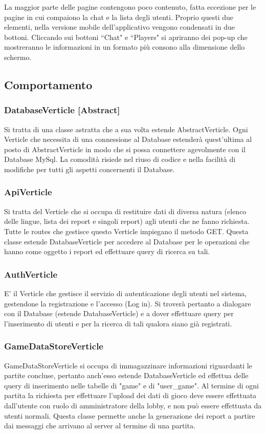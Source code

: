 \noindent La maggior parte delle pagine contengono poco contenuto, fatta eccezione per le pagine in cui compaiono la chat e la lista degli utenti.\newline
Proprio questi due elementi, nella versione mobile dell'applicativo vengono condensati in due bottoni. Cliccando sui bottoni ``Chat" e ``Players" si apriranno dei pop-up che mostreranno le informazioni in un formato più consono alla dimensione dello schermo.

\subsection{Comportamento}
%
\subsubsection{DatabaseVerticle [Abstract]}
Si tratta di una classe astratta che a sua volta estende AbstractVerticle. Ogni Verticle che necessita di una connessione al Database estenderà quest'ultima al posto di AbstractVerticle in modo che si possa connettere agevolmente con il Database MySql. La comodità risiede nel riuso di codice e nella facilità di modifiche per tutti gli aspetti concernenti il Database.

\subsubsection{ApiVerticle}
Si tratta del Verticle che si occupa di restituire dati di diversa natura (elenco delle lingue, lista dei report e singoli report) agli utenti che ne fanno richiesta. Tutte le routes che gestisce questo Verticle impiegano il metodo GET. Questa classe estende DatabaseVerticle per accedere al Database per le operazioni che hanno come oggetto i report ed effettuare query di ricerca su tali.

\subsubsection{AuthVerticle}
E' il Verticle che gestisce il servizio di autenticazione degli utenti nel sistema, gestendone la registrazione e l'accesso (Log in). Si troverà pertanto a dialogare con il Database (estende DatabaseVerticle) e a dover effettuare query per l'inserimento di utenti e per la ricerca di tali qualora siano già registrati.

\subsubsection{GameDataStoreVerticle}
GameDataStoreVerticle si occupa di immagazzinare informazioni riguardanti le partite concluse, pertanto anch'esso estende DatabaseVerticle ed effettua delle query di inserimento nelle tabelle di "game" e di "user\_game". Al termine di ogni partita la richiesta per effettuare l'upload dei dati di gioco deve essere effettuata dall'utente con ruolo di amministratore della lobby, e non può essere effettuata da utenti normali. Questa classe permette anche la generazione dei report a partire dai messaggi che arrivano al server al termine di una partita.

